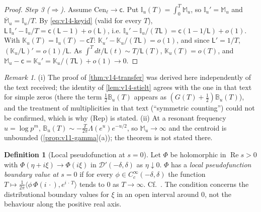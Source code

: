 \documentclass[11pt,a4paper]{article}
\numberwithin{equation}{section}
\theoremstyle{definition}
\newtheorem{definition}[theorem]{Definition}
\theoremstyle{remark}
\newtheorem{remark}[theorem]{Remark}
\begin{document}
\begin{proof}
\emph{Step 3 ($\Rightarrow$).} Assume $\mathrm{Cen}_\ell\to\mathsf c$. Put $\mathbb I_u(T)=\int_0^T\mathbb M_u$, so $\mathbb I_u'=\mathbb M_u$ and $\overline{\mathbb M}_u=\mathbb I_u/T$. By \eqref{eq:v14-keyid} (valid for every $T$), $\mathsf L\,\mathbb I_u'-\mathbb I_u/T=\mathsf c(\mathsf L-1)+o(\mathsf L)$, i.e. $\mathbb I_u'-\mathbb I_u/(T\mathsf L)=\mathsf c(1-1/\mathsf L)+o(1)$. With $\mathbb K_u(T)=\mathbb I_u(T)-\mathsf cT$: $\mathbb K_u'-\mathbb K_u/(T\mathsf L)=o(1)$, and since $\mathsf L'=1/T$, $(\mathbb K_u/\mathsf L)'=o(1)/\mathsf L$. As $\int^T\!dt/\mathsf L(t)\sim T/\mathsf L(T)$, $\mathbb K_u(T)=o(T)$, and $\mathbb M_u-\mathsf c=\mathbb K_u'=\mathbb K_u/(T\mathsf L)+o(1)\to0$.
\end{proof}

\begin{remark}
(i) The proof of \cref{thm:v14-transfer} was derived here independently of the text received; the identity of \cref{lem:v14-stielt} agrees with the one in that text for simple zeros (there the term $\frac12\mathbb B_u(T)$ appears as $(G(T)+\frac12)\mathbb B_u(T)$), and the treatment of multiplicities in that text (``symmetric counting'') could not be confirmed, which is why (Rep) is stated. (ii) At a resonant frequency $u=\log p^m$, $\mathbb B_u(T)\sim-\frac T{2\pi}\Lambda(e^u)e^{-u/2}$, so $\mathbb M_u\to\infty$ and the centroid is unbounded (\cref{prop:v11-gamma}(a)); the theorem is not stated there.
\end{remark}

\begin{definition}[Local pseudofunction at $s=0$]
Let $\Phi$ be holomorphic in $\operatorname{Re}s>0$ with $\Phi(\eta+i\xi)\to\Phi(i\xi)$ in $\mathcal D'(-\delta,\delta)$ as $\eta\downarrow0$. $\Phi$ has a \emph{local pseudofunction boundary value at $s=0$} if for every $\phi\in C_c^\infty(-\delta,\delta)$ the function $T\mapsto\frac1{2\pi}\langle\phi\,\Phi(i\,\cdot),e^{i\,\cdot\,T}\rangle$ tends to $0$ as $T\to\infty$. Cf.\ \cite{DebruyneVindas2019}. The condition concerns the distributional boundary values for $\xi$ in an open interval around $0$, not the behaviour along the positive real axis.
\end{definition}
\end{document}
